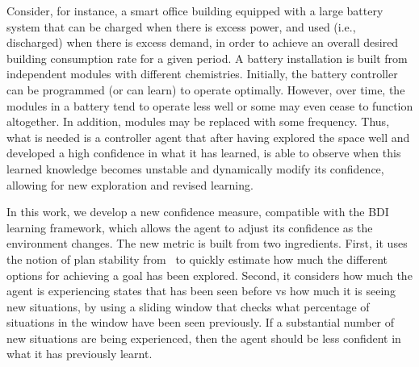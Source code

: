 Consider, for instance, a smart office building equipped with a large battery system that can be charged when there is excess power, and used (i.e., discharged) when there is excess demand, in order to achieve an overall desired building consumption rate for a given period. A battery installation is built from independent modules with different chemistries. Initially, the battery controller can be programmed (or can learn) to operate optimally. However, over time, the modules in a battery tend to operate less well or some may even cease to function altogether. In addition, modules may be replaced with some frequency.  
Thus, what is needed is a controller agent that after having explored the space well and developed a high confidence in what it has learned, is able to observe when this learned knowledge becomes unstable and dynamically modify its confidence, allowing for new exploration and revised learning.




In this work, we develop a new confidence measure, compatible with the BDI learning framework, which allows the agent to adjust its confidence as the environment changes.
The new metric is built from two ingredients.
First, it uses the notion of plan stability from~\cite{airiau09:enhancing,singh10:learning} to quickly estimate how much the different options for achieving a goal has been explored.
Second, it considers how much the agent is experiencing states that has been seen before vs how much it is seeing new situations, by using a sliding window that checks what percentage of situations in the window have been seen previously. If a substantial number of new situations are being experienced, then the agent should be less confident in what it has previously learnt. 

